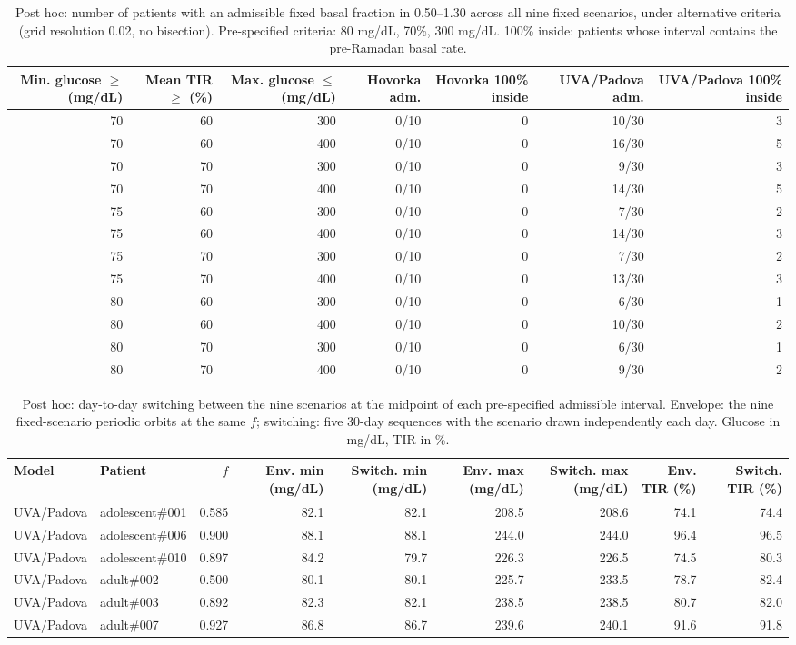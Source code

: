 \begin{table}[H]
\centering
\caption{Post hoc: number of patients with an admissible fixed basal fraction in 0.50--1.30 across all nine fixed scenarios, under alternative criteria (grid resolution 0.02, no bisection). Pre-specified criteria: 80 mg/dL, 70\%, 300 mg/dL. 100\% inside: patients whose interval contains the pre-Ramadan basal rate.}\label{tab:S7}
\footnotesize
\begin{tabular}{rrrrrrr}
\toprule
Min. glucose $\ge$ (mg/dL) & Mean TIR $\ge$ (\%) & Max. glucose $\le$ (mg/dL) & Hovorka adm. & Hovorka 100\% inside & UVA/Padova adm. & UVA/Padova 100\% inside \\
\midrule
70 & 60 & 300 & 0/10 & 0 & 10/30 & 3 \\
70 & 60 & 400 & 0/10 & 0 & 16/30 & 5 \\
70 & 70 & 300 & 0/10 & 0 & 9/30 & 3 \\
70 & 70 & 400 & 0/10 & 0 & 14/30 & 5 \\
75 & 60 & 300 & 0/10 & 0 & 7/30 & 2 \\
75 & 60 & 400 & 0/10 & 0 & 14/30 & 3 \\
75 & 70 & 300 & 0/10 & 0 & 7/30 & 2 \\
75 & 70 & 400 & 0/10 & 0 & 13/30 & 3 \\
80 & 60 & 300 & 0/10 & 0 & 6/30 & 1 \\
80 & 60 & 400 & 0/10 & 0 & 10/30 & 2 \\
80 & 70 & 300 & 0/10 & 0 & 6/30 & 1 \\
80 & 70 & 400 & 0/10 & 0 & 9/30 & 2 \\
\bottomrule
\end{tabular}
\end{table}

\begin{table}[H]
\centering
\caption{Post hoc: day-to-day switching between the nine scenarios at the midpoint of each pre-specified admissible interval. Envelope: the nine fixed-scenario periodic orbits at the same $f$; switching: five 30-day sequences with the scenario drawn independently each day. Glucose in mg/dL, TIR in \%.}\label{tab:S8}
\footnotesize
\begin{tabular}{llrrrrrrr}
\toprule
Model & Patient & $f$ & Env. min (mg/dL) & Switch. min (mg/dL) & Env. max (mg/dL) & Switch. max (mg/dL) & Env. TIR (\%) & Switch. TIR (\%) \\
\midrule
UVA/Padova & adolescent\#001 & 0.585 & 82.1 & 82.1 & 208.5 & 208.6 & 74.1 & 74.4 \\
UVA/Padova & adolescent\#006 & 0.900 & 88.1 & 88.1 & 244.0 & 244.0 & 96.4 & 96.5 \\
UVA/Padova & adolescent\#010 & 0.897 & 84.2 & 79.7 & 226.3 & 226.5 & 74.5 & 80.3 \\
UVA/Padova & adult\#002 & 0.500 & 80.1 & 80.1 & 225.7 & 233.5 & 78.7 & 82.4 \\
UVA/Padova & adult\#003 & 0.892 & 82.3 & 82.1 & 238.5 & 238.5 & 80.7 & 82.0 \\
UVA/Padova & adult\#007 & 0.927 & 86.8 & 86.7 & 239.6 & 240.1 & 91.6 & 91.8 \\
\bottomrule
\end{tabular}
\end{table}

